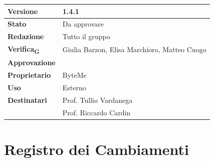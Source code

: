 \documentclass[11pt,a4paper]{article}
\newcommand{\gls}[1]{#1\textsubscript{G}}
\begin{document}
\begin{titlepage}
    \begin{table}[H]
        \centering
        \begin{tabular}{|l|p{5cm}|}
            \hline
            \textbf{Versione} & 1.4.1 \\
            \hline
            \textbf{Stato} & Da approvare \\
            \hline
            \textbf{Redazione} & Tutto il gruppo \\
            \hline
            \textbf{\gls{Verifica}} & Giulia Barzon, Elisa Marchioro, Matteo Cuogo \\
            \hline
            \textbf{Approvazione} & \\
            \hline
            \textbf{Proprietario} & ByteMe \\
            \hline
            \textbf{Uso} & Esterno \\
            \hline
            \textbf{Destinatari} & Prof. Tullio Vardanega \\ & Prof. Riccardo Cardin \\
            \hline
        \end{tabular}
    \end{table}
    
    \vfill
\end{titlepage}

\thispagestyle{empty}
\section*{Registro dei Cambiamenti}
\end{document}
